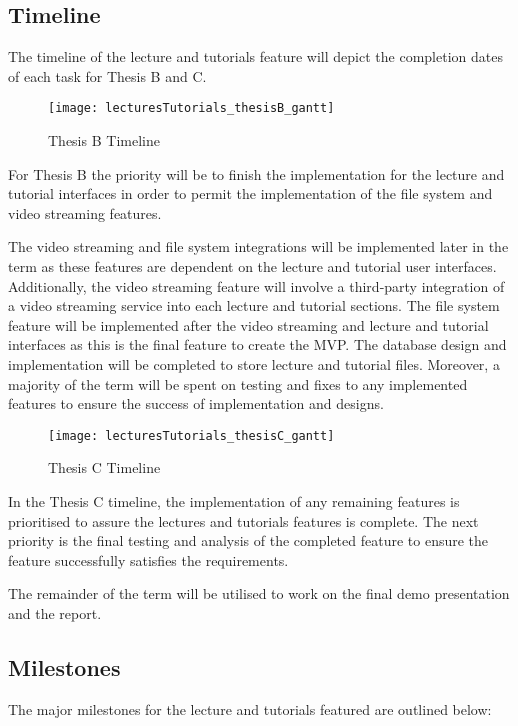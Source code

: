 \subsection{Timeline}
The timeline of the lecture and tutorials feature will depict the completion dates of each task for Thesis B and C.

\begin{figure}[h!]
    \centering
    \texttt{[image: lecturesTutorials\_thesisB\_gantt]}
    \caption{Thesis B Timeline}
\end{figure}

For Thesis B the priority will be to finish the implementation for the lecture and tutorial interfaces in order to permit 
the implementation of the file system and video streaming features.

The video streaming and file system integrations will be implemented later in the term as these features are dependent on 
the lecture and tutorial user interfaces. Additionally, the video streaming feature will involve a third-party integration 
of a video streaming service into each lecture and tutorial sections. The file system feature will be implemented after the 
video streaming and lecture and tutorial interfaces as this is the final feature to create the MVP. The database design and 
implementation will be completed to store lecture and tutorial files. Moreover, a majority of the term will be spent on testing 
and fixes to any implemented features to ensure the success of implementation and designs.

\begin{figure}[h!]
    \centering
    \texttt{[image: lecturesTutorials\_thesisC\_gantt]}
    \caption{Thesis C Timeline}
\end{figure}

In the Thesis C timeline, the implementation of any remaining features is prioritised to assure the lectures and 
tutorials features is complete. The next priority is the final testing and analysis of the completed feature to 
ensure the feature successfully satisfies the requirements. 

The remainder of the term will be utilised to work on the final demo presentation and the report. 

\subsection{Milestones}
The major milestones for the lecture and tutorials featured are outlined below:

